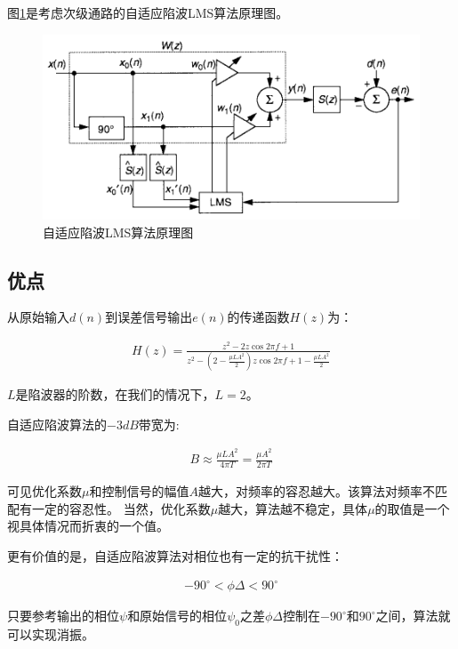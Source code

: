 \documentclass[12pt]{article}
\begin{document}
图\ref{fig:fig3}是考虑次级通路的自适应陷波LMS算法原理图。

\begin{figure}[H]
\begin{center}
\includegraphics[width=0.9\linewidth]{./images/自适应陷波LMS算法原理图.png}
\caption{自适应陷波LMS算法原理图}
\label{fig:fig3}
\end{center}
\end{figure}

\subsection{优点}
从原始输入$d(n)$到误差信号输出$e(n)$的传递函数$H(z)$为\cite{widrow1975adaptive}：

\begin{align}
H(z)=\frac{z^{2}-2z\cos2\pi f+1}{z^{2}-(2-\frac{\mu LA^{2}}{2})z\cos2\pi f+1-\frac{\mu LA^{2}}{2}}
\end{align}

$L$是陷波器的阶数，在我们的情况下，$L=2$。

自适应陷波算法的$-3dB$带宽为\cite{glover1977adaptive}:

\begin{align}
B\approx\frac{\mu LA^{2}}{4\pi T}=\frac{\mu A^{2}}{2\pi T}
\end{align}

可见优化系数$\mu$和控制信号的幅值$A$越大，对频率的容忍越大。该算法对频率不匹配有一定的容忍性。
当然，优化系数$\mu$越大，算法越不稳定，具体$\mu$的取值是一个视具体情况而折衷的一个值。

更有价值的是，自适应陷波算法对相位也有一定的抗干扰性\cite{kuo1995active}：

\begin{align}
-90^{\circ}<\phi\Delta<90^{\circ}
\end{align}

只要参考输出的相位$\psi$和原始信号的相位$\psi_{0}$之差$\phi\Delta$控制在$-90^{\circ}$和$90^{\circ}$之间，算法就可以实现消振。
\end{document}
